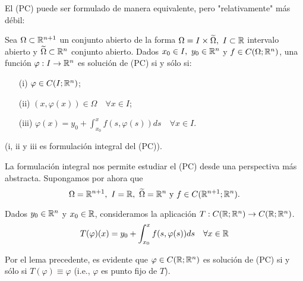 		\noindent El (PC) puede ser formulado de manera equivalente, pero "relativamente" más débil:

		\begin{lemma}
			Sea $\Omega \subset \mathbb{R}^{n+1}$ un conjunto abierto de la forma $\Omega = I \times \widetilde{\Omega},\ I \subset \mathbb{R}$ intervalo abierto y $\widetilde{\Omega} \subset \mathbb{R}^n$ conjunto abierto. Dados $x_0 \in I,\ y_0 \in \mathbb{R}^n$ y $f \in C(\Omega;\mathbb{R}^n)$, una función $\varphi : I \to \mathbb{R}^n$ es solución de (PC) si y sólo si:
			\begin{enumerate}
				\item[(i)] $\varphi \in C(I;\mathbb{R}^n)$;

				\item[(ii)] $(x,\varphi(x)) \in \Omega \quad \forall x \in I$;

				\item[(iii)] $\varphi (x) = y_0 + \int_{x_0}^{x} f(s,\varphi(s)) ds \quad \forall x \in I$.
			\end{enumerate}
			(i, ii y iii es formulación integral del (PC)).
		\end{lemma}

		\begin{remark}
			La formulación integral nos permite estudiar el (PC) desde una perspectiva más abstracta. Supongamos por ahora que
			\[ \Omega = \mathbb{R}^{n+1},\ I = \mathbb{R},\ \widetilde{\Omega} = \mathbb{R}^n \text{ y } f \in C(\mathbb{R}^{n+1};\mathbb{R}^n). \]
		\end{remark}

		\noindent Dados $y_0 \in \mathbb{R}^n$ y $x_0 \in \mathbb{R}$, consideramos la aplicación $T: C(\mathbb{R};\mathbb{R}^n) \to C(\mathbb{R};\mathbb{R}^n)$.
		\[ T(\varphi)(x) = y_0 + \int_{x_0}^{x} f(s,\varphi(s)) ds \quad \forall x \in \mathbb{R} \]
		
		\noindent Por el lema precedente, es evidente que $\varphi \in C(\mathbb{R};\mathbb{R}^n)$ es solución de (PC) si y sólo si $T(\varphi) \equiv \varphi$ (i.e., $\varphi$ es punto fijo de $T$).
